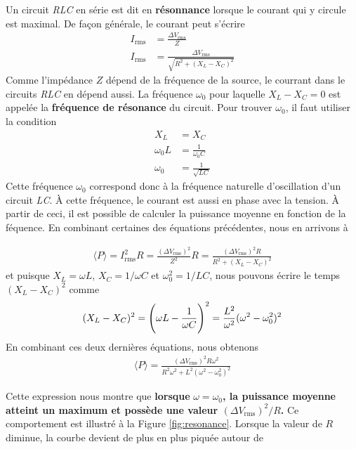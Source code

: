 \documentclass[titlepage,oneside,a4paper,11pt]{book} %
\begin{document}
Un circuit \emph{RLC} en série est dit en \textbf{résonnance} lorsque le courant qui y circule est maximal.  De façon générale, le courant peut s'écrire
\begin{align*}
    I_{\mathrm{rms}}&=\frac{\Delta V_{\mathrm{rms}}}{Z}\\
    I_{\mathrm{rms}}&=\frac{\Delta V_{\mathrm{rms}}}{\sqrt{R^2+\left(X_L-X_C\right)^2}}
\end{align*}
Comme l'impédance $Z$ dépend de la fréquence de la source, le courrant dans le circuits \emph{RLC} en dépend aussi.  La fréquence $\omega_0$ pour laquelle $X_L-X_C=0$ est appelée la \textbf{fréquence de résonance} du circuit.  Pour trouver $\omega_0$, il faut utiliser la condition
\begin{align*}
    X_L&=X_C\\
    \omega_0 L &= \frac{1}{\omega_0C}\\
    \omega_0 &= \frac{1}{\sqrt{LC}}
\end{align*}
Cette fréquence $\omega_0$ correspond donc à la fréquence naturelle d'oscillation d'un circuit \emph{LC}. À cette fréquence, le courant est aussi en phase avec la tension. À partir de ceci, il est possible de calculer la puissance moyenne en fonction de la féquence. En combinant certaines des équations précédentes, nous en arrivons à 

\begin{align*}
    \langle P \rangle=I_{\mathrm{\mathrm{rms}}}^2 R=\frac{\left(\Delta V_{\mathrm{\mathrm{rms}}}\right)^2}{Z^2} R=\frac{\left(\Delta V_{\mathrm{\mathrm{rms}}}\right)^2 R}{R^2+\left(X_L-X_C\right)^2}
\end{align*}
et puisque $X_L = \omega L$, $X_C = 1/\omega C$ et $\omega_0^2 = 1/LC$, nous pouvons écrire le temps $(X_L-X_C)^2$ comme
\begin{align*}
    (X_L-X_C)^2 = \Bigg{(}\omega  L - \frac{1}{\omega C}\Bigg{)}^2=\frac{L^2}{\omega^2}(\omega^2-\omega_0^2)^2
\end{align*}
En combinant ces deux dernières équations, nous obtenons
\begin{align}
    \langle P \rangle = \frac{(\Delta V_{\mathrm{rms}})^2R\omega^2}{R^2\omega^2+L^2(\omega^2-\omega_0^2)^2}
    \label{eq:puissance}
\end{align}

Cette expression nous montre que \textbf{lorsque} $\omega = \omega_0$\textbf{, la puissance moyenne atteint un maximum et possède une valeur $(\Delta V_{\mathrm{rms}})^2/R$.}  Ce comportement est illustré à la Figure \ref{fig:resonance}. Lorsque la valeur de $R$ diminue, la courbe devient de plus en plus piquée autour de 
\end{document}
